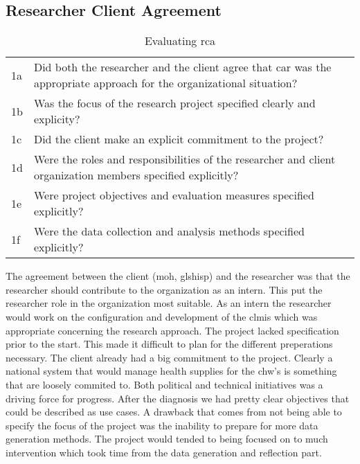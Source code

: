 \subsection{Researcher Client Agreement}
\begin{table}
\centering
\begin{tabular}{p{2cm} p{8cm}}
\hline
1a & Did both the researcher and the client agree that \gls{car} was the appropriate approach for the organizational situation? \\
1b & Was the focus of the research project specified clearly and explicity? \\
1c & Did the client make an explicit commitment to the project? \\
1d & Were the roles and responsibilities of the researcher and client organization members specified explicitly? \\
1e & Were project objectives and evaluation measures specified explicitly? \\
1f & Were the data collection and analysis methods specified explicitly? \\
\hline
\end{tabular}
\caption{Evaluating \gls{rca}}
\label{tab:evarca}
\end{table}
The agreement between the client (\gls{moh}, gls{hisp}) and the researcher was that the researcher should contribute to the organization as an intern.
This put the researcher role in the organization most suitable. 
As an intern the researcher would work on the configuration and development of the \gls{clmis} which was appropriate concerning the research approach. The project lacked specification prior to the start. This made it difficult to plan for the different preperations necessary.
The client already had a big commitment to the project. 
Clearly a national system that would manage health supplies for the \gls{chw}'s is something that are loosely commited to. 
Both political and technical initiatives was a driving force for progress. 
After the diagnosis we had pretty clear objectives that could be described as use cases.
A drawback that comes from not being able to specify the focus of the project was the inability to prepare for more data generation methods.
The project would tended to being focused on to much intervention which took time from the data generation and reflection part.



